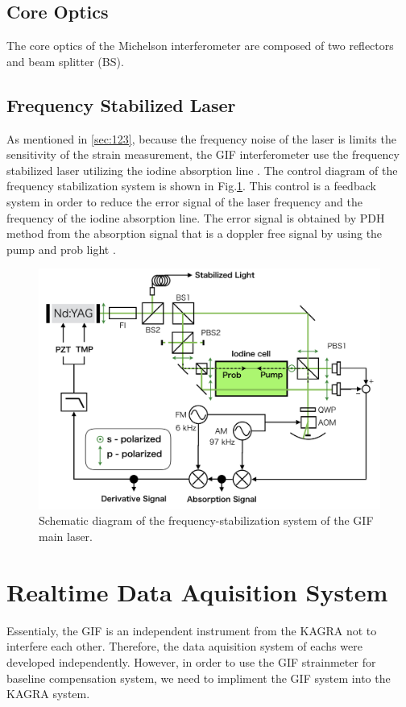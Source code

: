 \subsection{Core Optics}
The core optics of the Michelson interferometer are composed of two reflectors and beam splitter (BS). 


\subsection{Frequency Stabilized Laser} \label{sec:sec135}
As mentioned in \cref{sec:123}, because the frequency noise of the laser is limits the sensitivity of the strain measurement, the GIF interferometer use the frequency stabilized laser utilizing the iodine absorption line \cite{araya2002iodine}. The control diagram of the frequency stabilization system is shown in Fig.\ref{img:img417}. This control is a feedback system in order to reduce the error signal of the laser frequency and the frequency of the iodine absorption line. The error signal is obtained by PDH method from the absorption signal that is a doppler free signal by using the pump and prob light \cite{snyder1980high}.
\begin{figure}[h]
  \begin{center}   
    \includegraphics[width=12cm]{./img_chap4/img417.png}
    \caption{Schematic diagram of the frequency-stabilization system of the GIF main laser.}\label{img:img417}
  \end{center}
\end{figure}




\section{Realtime Data Aquisition System} \label{sec:sec44}
Essentialy, the GIF is an independent instrument from the KAGRA not to interfere each other. Therefore, the data aquisition system of eachs were developed independently. However, in order to use the GIF strainmeter for baseline compensation system, we need to impliment the GIF system into the KAGRA system. 

